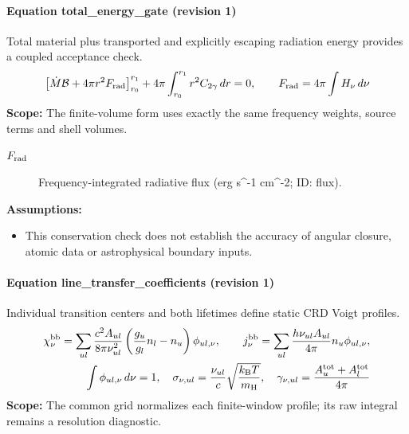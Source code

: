 \paragraph{Equation total\_energy\_gate (revision 1)}
Total material plus transported and explicitly escaping radiation energy provides a coupled acceptance check.
\begin{equation}
\begin{aligned}
\left[\dot M\mathcal B+4\pi r^2F_{\rm rad}\right]_{r_0}^{r_1}+4\pi\int_{r_0}^{r_1}r^2C_{2\gamma}\,dr=0,\qquad F_{\rm rad}=4\pi\int H_\nu\,d\nu
\end{aligned}
\label{eq:escape.coupled_5f_hydrogen:total_5f_energy_5f_gate:1}
\end{equation}
\noindent\textbf{Scope:} The finite-volume form uses exactly the same frequency weights, source terms and shell volumes.

\begin{description}
\item[$F_{\rm rad}$] Frequency-integrated radiative flux (erg s\textasciicircum{}-1 cm\textasciicircum{}-2; ID: flux).
\end{description}

\noindent\textbf{Assumptions:}
\begin{itemize}
\item This conservation check does not establish the accuracy of angular closure, atomic data or astrophysical boundary inputs.
\end{itemize}

\paragraph{Equation line\_transfer\_coefficients (revision 1)}
Individual transition centers and both lifetimes define static CRD Voigt profiles.
\begin{equation}
\begin{aligned}
\chi_\nu^{\rm bb}=\sum_{ul}\frac{c^2A_{ul}}{8\pi\nu_{ul}^2}\left(\frac{g_u}{g_l}n_l-n_u\right)\phi_{ul,\nu},\qquad j_\nu^{\rm bb}=\sum_{ul}\frac{h\nu_{ul}A_{ul}}{4\pi}n_u\phi_{ul,\nu},\\\int\phi_{ul,\nu}\,d\nu=1,\quad\sigma_{\nu,ul}=\frac{\nu_{ul}}c\sqrt{\frac{k_{\rm B}T}{m_{\rm H}}},\quad\gamma_{\nu,ul}=\frac{A_u^{\rm tot}+A_l^{\rm tot}}{4\pi}
\end{aligned}
\label{eq:escape.coupled_5f_hydrogen:line_5f_transfer_5f_coefficients:1}
\end{equation}
\noindent\textbf{Scope:} The common grid normalizes each finite-window profile; its raw integral remains a resolution diagnostic.

